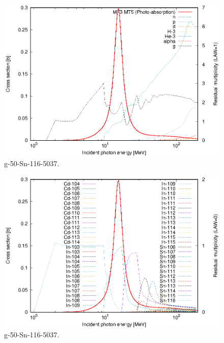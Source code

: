 \begin{figure}
 \includegraphics[width=\linewidth]{eps/g_50-Sn-116_5037.eps}
  \caption{g-50-Sn-116-5037.}
\end{figure}
\begin{figure}
 \includegraphics[width=\linewidth]{eps-law0/g_50-Sn-116_5037.eps}
 \caption{g-50-Sn-116-5037.}
\end{figure}
\newpage \clearpage

